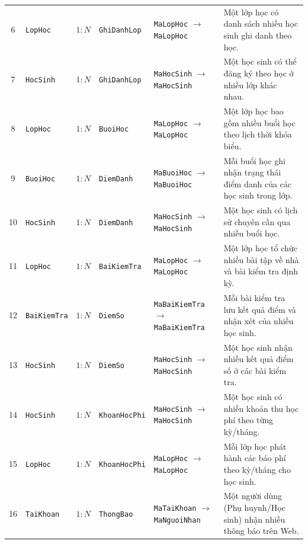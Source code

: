 {\begin{longtable}{@{}c >{\raggedright\arraybackslash}p{2.0cm} c >{\raggedright\arraybackslash}p{2.0cm} >{\raggedright\arraybackslash}p{3.6cm} >{\raggedright\arraybackslash}p{4.5cm}@{}}
6 & \texttt{LopHoc} & $1 : N$ & \texttt{GhiDanhLop} & \texttt{MaLopHoc} $\rightarrow$ \texttt{MaLopHoc} & Một lớp học có danh sách nhiều học sinh ghi danh theo học. \\
7 & \texttt{HocSinh} & $1 : N$ & \texttt{GhiDanhLop} & \texttt{MaHocSinh} $\rightarrow$ \texttt{MaHocSinh} & Một học sinh có thể đăng ký theo học ở nhiều lớp khác nhau. \\
8 & \texttt{LopHoc} & $1 : N$ & \texttt{BuoiHoc} & \texttt{MaLopHoc} $\rightarrow$ \texttt{MaLopHoc} & Một lớp học bao gồm nhiều buổi học theo lịch thời khóa biểu. \\
9 & \texttt{BuoiHoc} & $1 : N$ & \texttt{DiemDanh} & \texttt{MaBuoiHoc} $\rightarrow$ \texttt{MaBuoiHoc} & Mỗi buổi học ghi nhận trạng thái điểm danh của các học sinh trong lớp. \\
10 & \texttt{HocSinh} & $1 : N$ & \texttt{DiemDanh} & \texttt{MaHocSinh} $\rightarrow$ \texttt{MaHocSinh} & Một học sinh có lịch sử chuyên cần qua nhiều buổi học. \\
11 & \texttt{LopHoc} & $1 : N$ & \texttt{BaiKiemTra} & \texttt{MaLopHoc} $\rightarrow$ \texttt{MaLopHoc} & Một lớp học tổ chức nhiều bài tập về nhà và bài kiểm tra định kỳ. \\
12 & \texttt{BaiKiemTra} & $1 : N$ & \texttt{DiemSo} & \texttt{MaBaiKiemTra} $\rightarrow$ \texttt{MaBaiKiemTra} & Mỗi bài kiểm tra lưu kết quả điểm và nhận xét của nhiều học sinh. \\
13 & \texttt{HocSinh} & $1 : N$ & \texttt{DiemSo} & \texttt{MaHocSinh} $\rightarrow$ \texttt{MaHocSinh} & Một học sinh nhận nhiều kết quả điểm số ở các bài kiểm tra. \\
14 & \texttt{HocSinh} & $1 : N$ & \texttt{KhoanHocPhi} & \texttt{MaHocSinh} $\rightarrow$ \texttt{MaHocSinh} & Một học sinh có nhiều khoản thu học phí theo từng kỳ/tháng. \\
15 & \texttt{LopHoc} & $1 : N$ & \texttt{KhoanHocPhi} & \texttt{MaLopHoc} $\rightarrow$ \texttt{MaLopHoc} & Mỗi lớp học phát hành các báo phí theo kỳ/tháng cho học sinh. \\
16 & \texttt{TaiKhoan} & $1 : N$ & \texttt{ThongBao} & \texttt{MaTaiKhoan} $\rightarrow$ \texttt{MaNguoiNhan} & Một người dùng (Phụ huynh/Học sinh) nhận nhiều thông báo trên Web. \\
\bottomrule
\end{longtable}
}
